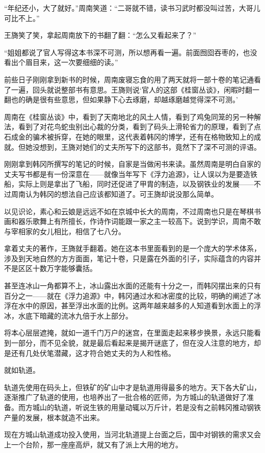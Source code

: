“年纪还小，大了就好。”周南笑道：“二哥就不错，读书习武时都没叫过苦，大哥儿可比不上。”

王旖笑了笑，拿起周南放下的书翻了翻：“怎么又看起来了？”

“姐姐都说了官人写得这本书深不可测，所以想再看一遍。前面囫囵吞枣的，也没看出个眉目来，这一次要细细的读。”

前些日子刚刚拿到新书的时候，周南废寝忘食的用了两天就将一部十卷的笔记通看了一遍，回头就说整部书有意思。王旖则说‘官人的这部《桂窗丛谈》，闲暇时翻一翻也的确是很有些意思，但如果静下心去琢磨，却越琢磨越觉得深不可测。’

周南在《桂窗丛谈》中，看到了天南地北的风土人情，看到了鸡兔同笼的另一种解法，看到了对花鸟蛇虫别出心裁的分类，看到了码头上滑轮省力的原理，看到了点石成金的骗术被拆穿，在她的眼里，这代表着韩冈的博学，还有在格物致知上的成就。但她没想到，王旖对她们的丈夫所写下的这部书，竟然下了深不可测的评语。

刚刚拿到韩冈所撰写的笔记的时候，自家是当做闲书来读。虽然周南是明白自家的丈夫写书都是有一份深意在——就像当年写下《浮力追源》，让人误以为是要造铁船，实际上则是拿出了飞船，同时还促进了甲胄的制造，以及钢铁业的发展——不过周南认为韩冈的想法自己应该都知道了。可王旖却说没那么简单。

以见识论，素心和云娘是远远不如在京城中长大的周南，不过周南也只是在琴棋书画和器乐歌舞上有所擅长，作诗作词能跟一家之主一较高下。说到学识，周南不敢与宰相家的女儿相比，相信了七八分。

拿着丈夫的著作，王旖就手翻着。她在这本书里面看到的是一个庞大的学术体系，涉及到天地自然的方方面面，笔记十卷，只是露在外面的引子，实际蕴含的内容并不是区区十数万字能够囊括。

甚至连冰山一角都算不上，冰山露出水面的还能有十分之一，而韩冈摆出来的只有百分之一——就在《浮力追源》中，韩冈通过水和冰密度的比较，明确的阐述了冰浮在水中的原因，甚至浮出水面的比例。这两年越来越多的人知道看到水面上的浮冰，水底下暗藏的流冰九倍于水上部分。

将本心层层遮掩，就如一道千门万户的迷宫，在里面走起来移步换景，永远只能看到一部分，而不见全貌，就是最后看起来是揭开谜底了，但在没人注意的地方，却是还有几处伏笔潜藏，这才符合她丈夫的为人和性格。

就如轨道。

轨道先使用在码头上，但铁矿的矿山中才是轨道用得最多的地方。天下各大矿山，逐渐推广了轨道的使用，也培养出了一批合格的匠师，为方城山的轨道做好了准备。而方城山的轨道，听说生铁的用量动辄以万斤计，若是没有之前韩冈推动钢铁产量的发展，根本就造不出来。

现在方城山轨道成功投入使用，当河北轨道提上台面之后，国中对钢铁的需求又会上一个台阶，那一座座高炉，就又有了派上大用的地方。

